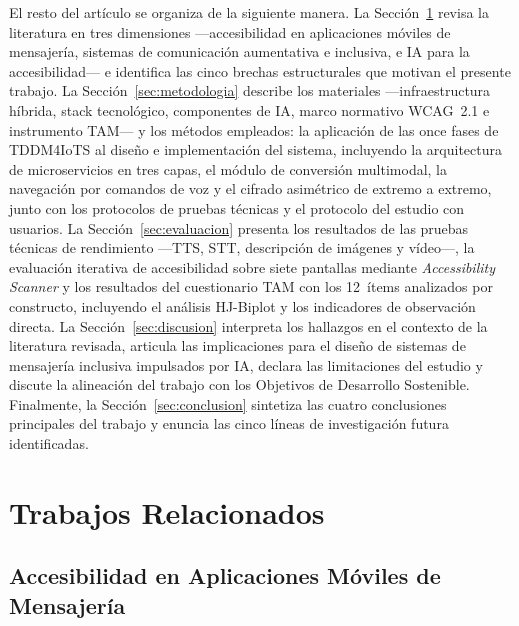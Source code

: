 \documentclass[journal]{IEEEtran}
\begin{document}
		El resto del art\'iculo se organiza de la siguiente manera.
		La Secci\'on~\ref{sec:relacionados} revisa la literatura en tres dimensiones ---accesibilidad en aplicaciones m\'oviles de mensajer\'ia, sistemas de comunicaci\'on aumentativa e inclusiva, e IA para la accesibilidad--- e identifica las cinco brechas estructurales que motivan el presente trabajo. La Secci\'on~\ref{sec:metodologia} describe los materiales ---infraestructura h\'ibrida, stack tecnol\'ogico, componentes de IA, marco normativo WCAG~2.1 e instrumento TAM--- y los m\'etodos empleados: la aplicaci\'on de las once fases de TDDM4IoTS al dise\~no e implementaci\'on del sistema, incluyendo la arquitectura de microservicios en tres capas, el m\'odulo de conversi\'on multimodal, la navegaci\'on por comandos de voz y el cifrado asim\'etrico de extremo a extremo, junto con los protocolos de pruebas t\'ecnicas y el protocolo del estudio con usuarios. La Secci\'on~\ref{sec:evaluacion} presenta los resultados de las pruebas t\'ecnicas de rendimiento ---TTS, STT, descripci\'on de im\'agenes y v\'ideo---, la evaluaci\'on iterativa de accesibilidad sobre siete pantallas mediante \textit{Accessibility Scanner} y los resultados del cuestionario TAM con los 12~\'items analizados por constructo, incluyendo el an\'alisis HJ-Biplot y los indicadores de observaci\'on directa. La Secci\'on~\ref{sec:discusion} interpreta los hallazgos en el contexto de la literatura revisada, articula las implicaciones para el dise\~no de sistemas de mensajer\'ia inclusiva impulsados por IA, declara las limitaciones del estudio y discute la alineaci\'on del trabajo con los Objetivos de Desarrollo Sostenible. Finalmente, la Secci\'on~\ref{sec:conclusion} sintetiza las cuatro conclusiones principales del trabajo y enuncia las cinco l\'ineas de investigaci\'on futura identificadas.
	
	\section{Trabajos Relacionados}
	\label{sec:relacionados}
	
		\subsection{Accesibilidad en Aplicaciones M\'oviles de Mensajer\'ia}
		
\end{document}
